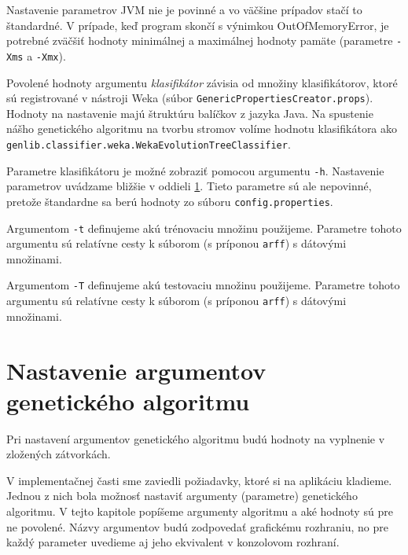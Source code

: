 Nastavenie parametrov JVM nie je povinné a vo väčšine prípadov stačí to štandardné. V prípade, keď program skončí s výnimkou OutOfMemoryError, je potrebné zväčšiť hodnoty minimálnej a maximálnej hodnoty pamäte (parametre \verb|-Xms| a \verb|-Xmx|).

Povolené hodnoty argumentu \emph{klasifikátor} závisia od množiny klasifikátorov, ktoré sú registrované v nástroji Weka (súbor \verb|GenericPropertiesCreator.props|). Hodnoty na nastavenie majú štruktúru balíčkov z jazyka Java. Na spustenie nášho genetického algoritmu na tvorbu stromov volíme hodnotu klasifikátora ako \verb|genlib.classifier.weka.WekaEvolutionTreeClassifier|.

Parametre klasifikátoru je možné zobraziť pomocou argumentu \verb|-h|. Nastavenie parametrov uvádzame bližšie v oddieli \ref{kapII:config}. Tieto parametre sú ale nepovinné, pretože štandardne sa berú hodnoty zo súboru \verb|config.properties|.

Argumentom \verb|-t| definujeme akú trénovaciu množinu použijeme. Parametre tohoto argumentu sú relatívne cesty k súborom (s príponou \verb|arff|) s dátovými množinami.

Argumentom \verb|-T| definujeme akú testovaciu množinu použijeme. Parametre tohoto argumentu sú relatívne cesty k súborom (s príponou \verb|arff|) s dátovými množinami.

\section{Nastavenie argumentov genetického algoritmu}\label{kapII:config}
\begin{observation}
Pri nastavení argumentov genetického algoritmu budú hodnoty na vyplnenie v zložených zátvorkách.
\end{observation}

V implementačnej časti sme zaviedli požiadavky, ktoré si na aplikáciu kladieme. Jednou z nich bola možnosť nastaviť argumenty (parametre) genetického algoritmu. V tejto kapitole popíšeme argumenty algoritmu a aké hodnoty sú pre ne povolené. Názvy argumentov budú zodpovedať grafickému rozhraniu, no pre každý parameter uvedieme aj jeho ekvivalent v konzolovom rozhraní.

